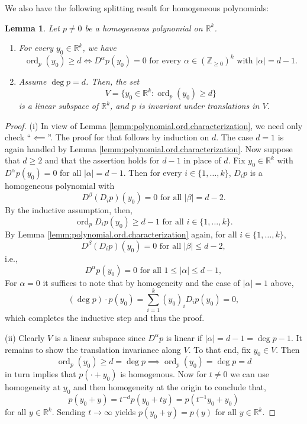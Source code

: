 \documentclass[11pt, letterpaper, reqno]{amsart}
\numberwithin{equation}{section}
\newtheorem{Lem}[Def]{Lemma}
\theoremstyle{remark}
\newcommand{\RR}{\mathbb{R}}
\newcommand{\ZZ}{\mathbb{Z}}
\newcommand{\Ord}{\operatorname{ord}}
\begin{document}
    We also have the following splitting result for homogeneous polynomials:
    
    \begin{Lem}\label{Lem_homog-poly-splitting}
    Let $p\neq 0$ be a homogeneous polynomial on $\RR^k$.
    \begin{enumerate}
    	\item[(i)] For every $y_0 \in \RR^k$, we have
	\[ \Ord_p(y_0) \geq d \iff D^\alpha p(y_0)=0 \text{ for every } \alpha \in (\ZZ_{\geq 0})^k \text{ with } |\alpha| = d-1. \]
        \item[(ii)] Assume $\deg p = d$. Then, the set
        \[ V = \{ y_0 \in \RR^k : \Ord_p(y_0) \geq d \} \]
        is a linear subspace of $\RR^k$, and $p$ is invariant under translations in $V$.
      \end{enumerate}
    \end{Lem}
    \begin{proof}
    
    {(i)} In view of Lemma \ref{lemm:polynomial.ord.characterization}, we need only check ``$\impliedby$''. The proof for that follows by induction on $d$. The case $d=1$ is again handled by Lemma \ref{lemm:polynomial.ord.characterization}. Now suppose that $d \geq 2$ and that the assertion holds for $d-1$ in place of $d$. Fix $y_0 \in \RR^k$ with $D^\alpha p(y_0) = 0$ for all $|\alpha| = d-1$. Then for every $i \in \{ 1, \ldots, k \}$, $D_i p$ is a homogeneous polynomial with
    \[ D^\beta (D_i p)(y_0) = 0 \text{ for all } |\beta| = d-2. \]
    By the inductive assumption, then,
    \[ \Ord_p D_i p(y_0) \geq d-1 \text{ for all } i \in \{ 1, \ldots, k \}. \]
    By Lemma \ref{lemm:polynomial.ord.characterization} again, for all $i \in \{ 1, \ldots, k \}$,
    \[ D^\beta (D_i p)(y_0) = 0 \text{ for all } |\beta| \leq d-2, \]
    i.e.,
    \[ D^\alpha p(y_0) = 0 \text{ for all } 1 \leq |\alpha| \leq d-1, \]
    For $\alpha=0$ it suffices to note that by homogeneity and the case of $|\alpha|=1$ above,
    \[ (\deg p)\cdot p(y_0) = \sum_{i=1}^k (y_0)_i D_i p(y_0) = 0, \]
    which completes the inductive step and thus the proof.
    
    {(ii)} Clearly $V$ is a linear subspace since $D^\alpha p$ is linear if $|\alpha|=d-1 = \deg p - 1$. It remains to show the translation invariance along $V$. To that end, fix $y_0 \in V$. Then 
    \[ \Ord_p(y_0) \geq d = \deg p \implies \Ord_p(y_0) = \deg p = d \]
    in turn implies that $p(\cdot+y_0)$ is homogenous. Now for $t \neq 0$ we can use homogeneity at $y_0$ and then homogeneity at the origin to conclude that,  
    \[
    p(y_0+y) = t^{-d} p(y_0+ty) =  p(t^{-1} y_0 + y_0)
    \]
    for all $y \in \RR^k$. Sending $t \to \infty$ yields $p(y_0 + y) = p(y)$ for all $y \in \RR^k$.
    \end{proof}
    
\end{document}
